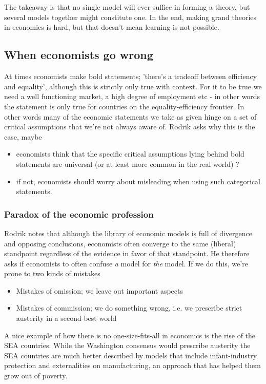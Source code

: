 \documentclass[12pt, a4paper]{article}
\begin{document}
\begin{multicols}{2}
\\ \\
The takeaway is that no single model will ever suffice in forming a theory, but several models together might constitute one. In the end, making grand theories in economics is hard, but that doesn't mean learning is not possible.  

\subsection{When economists go wrong}
At times economists make bold statements; 'there's a tradeoff between efficiency and equality', although this is strictly only true with context. For it to be true we need a well functioning market, a high degree of employment etc - in other words the statement is only true for countries on the equality-efficiency frontier. In other words many of the economic statements we take as given hinge on a set of critical assumptions that we're not always aware of. Rodrik asks why this is the case, maybe
\begin{itemize}
\item economists think that the specific critical assumptions lying behind bold statements are universal (or at least more common in the real world) ?
\item if not, economists should worry about misleading when using such categorical statements.
\end{itemize}
\subsubsection{Paradox of the economic profession}
Rodrik notes that although the library of economic models is full of divergence and opposing conclusions, economists often converge to the same (liberal) standpoint regardless of the evidence in favor of that standpoint. He therefore asks if economists to often confuse \textit{a} model for \textit{the} model. If we do this, we're prone to two kinds of mistakes 
\begin{itemize}
\item Mistakes of omission; we leave out important aspects
\item Mistakes of commission; we do something wrong, i.e. we prescribe strict austerity in a second-best world
\end{itemize}
A nice example of how there is no one-size-fits-all in economics is the rise of the SEA countries. While the Washington consensus would prescribe austerity the SEA countries are much better described by models that include infant-industry protection and externalities on manufacturing, an approach that has helped them grow out of poverty. 


\end{multicols}
\end{document}
